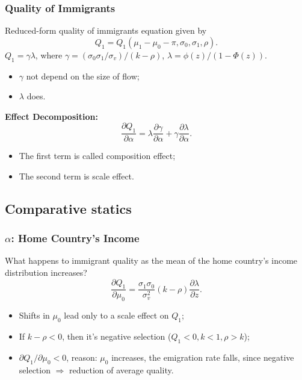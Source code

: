 \documentclass[10pt]{beamer}
\begin{document}
\begin{frame}[c]\frametitle{Quality of Immigrants}
Reduced-form quality of immigrants equation given by
\begin{equation}
    Q_{1} = Q_{1} (\mu_{1} - \mu_{0} -\pi,\sigma_{0},\sigma_{1},\rho).
\end{equation}
$Q_{1} = \gamma \lambda$, where $\gamma = (\sigma_{0}\sigma_{1}/\sigma_{v})/(k-\rho)$, $\lambda = \phi(z)/(1-\Phi(z))$.
\begin{itemize}
    \item $\gamma$ not depend on the size of flow;
    \item $\lambda$ does.
\end{itemize}

\textbf{Effect Decomposition:}
\begin{equation}
    \frac{\partial Q_{1}}{\partial \alpha} = \lambda \frac{\partial \gamma}{\partial \alpha} + \gamma \frac{\partial \lambda}{\partial \alpha}.
\end{equation}
\begin{itemize}
    \item The first term is called \alert{composition} effect;
    \item The second term is \alert{scale} effect.
\end{itemize}

\end{frame}
\subsection{Comparative statics}
\begin{frame}[c]\frametitle{$\alpha$: Home Country's Income}
What happens to immigrant quality as the mean of the home country's income distribution increases?
\begin{equation}
    \frac{\partial Q_{1}}{\partial \mu_{0}} = \frac{\sigma_{1}\sigma_{0}}{\sigma_{v}^{2}}(k-\rho)\frac{\partial \lambda}{\partial z}.
\end{equation}
\begin{itemize}
    \item Shifts in  $\mu_{0}$ lead only to a scale effect on  $Q_{1}$;
    \item If $k - \rho <0$, then it\rq{}s negative selection ($Q_{1} < 0, k < 1, \rho > k$);
    \item $\partial Q_{1} /\partial \mu_{0} <0$, reason: $\mu_{0}$ increases, the emigration rate falls, since negative selection $\Rightarrow$ reduction of average quality.
\end{itemize}

\end{frame}
\end{document}
